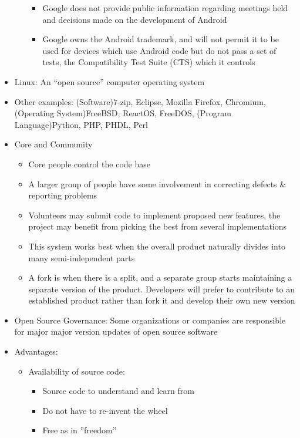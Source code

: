 \documentclass[12pt,openany]{book}
\begin{document}
\begin{itemize}
\begin{itemize}
\begin{itemize}
            \item Google does not provide public information regarding meetings held and decisions made on the development of Android
            \item Google owns the Android trademark, and will not permit it to be used for devices which use Android code but do not pass a set of tests, the Compatibility Test Suite (CTS) which it controls
        \end{itemize}
    \end{itemize}
    \item Linux: An ``open source'' computer operating system
    \item Other examples: (Software)7-zip, Eclipse, Mozilla Firefox, Chromium, (Operating System)FreeBSD, ReactOS, FreeDOS, (Program Language)Python, PHP, PHDL, Perl
    \item Core and Community
    \begin{itemize}
        \item Core people control the code base
        \item A larger group of people have some involvement in correcting defects \& reporting problems
        \item Volunteers may submit code to implement proposed new features, the project may benefit from picking the best from several implementations
        \item This system works best when the overall product naturally divides into many semi-independent parts
        \item A fork is when there is a split, and a separate group starts maintaining a separate version of the product. Developers will prefer to contribute to an established product rather than fork it and develop their own new version
    \end{itemize}
    \item Open Source Governance: Some organizations or companies are responsible for major major version updates of open source software
    \item Advantages:
    \begin{itemize}
        \item Availability of source code:
        \begin{itemize}
            \item Source code to understand and learn from
            \item Do not have to re-invent the wheel
            \item Free as in ''freedom''

\end{itemize}
\end{itemize}
\end{itemize}
\end{document}
